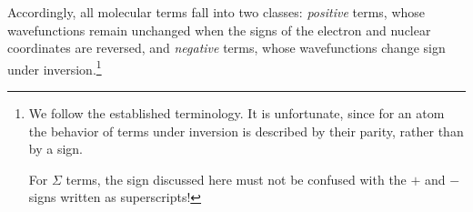 Accordingly, all molecular terms fall into two classes: \emph{positive} terms, whose wavefunctions remain unchanged when the signs of the electron and nuclear coordinates are reversed, and \emph{negative} terms, whose wavefunctions change sign under inversion.\footnote{We follow the established terminology. It is unfortunate, since for an atom the behavior of terms under inversion is described by their parity, rather than by a sign.

For $\Sigma$ terms, the sign discussed here must not be confused with the $+$ and $-$ signs written as superscripts!}
